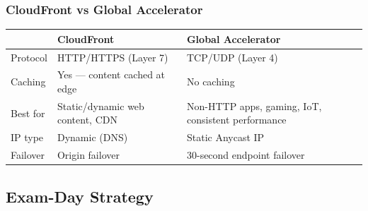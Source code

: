 \subsubsection{CloudFront vs Global Accelerator}

\begin{comparebox}[title={CloudFront vs Global Accelerator}]
\begin{tabular}{@{}p{3.5cm}p{4.5cm}p{4cm}@{}}
\toprule
 & \textbf{CloudFront} & \textbf{Global Accelerator} \\
\midrule
Protocol    & HTTP/HTTPS (Layer 7)           & TCP/UDP (Layer 4) \\
Caching     & Yes --- content cached at edge & No caching \\
Best for    & Static/dynamic web content, CDN & Non-HTTP apps, gaming, IoT, consistent performance \\
IP type     & Dynamic (DNS)                  & Static Anycast IP \\
Failover    & Origin failover                & 30-second endpoint failover \\
\bottomrule
\end{tabular}
\end{comparebox}

\subsection{Exam-Day Strategy}

